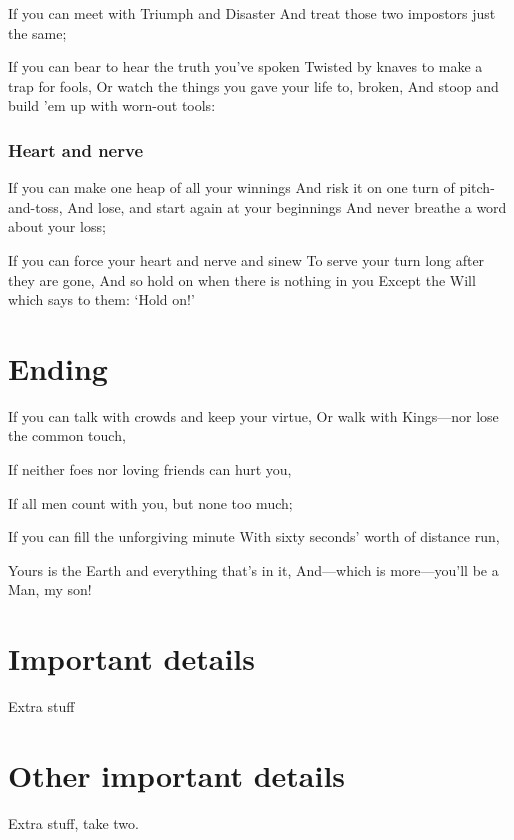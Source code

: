 \documentclass[a4paper, technote, compsoc]{IEEEtran}
\begin{document}
If you can meet with Triumph and Disaster
   And treat those two impostors just the same;   

If you can bear to hear the truth you’ve spoken
   Twisted by knaves to make a trap for fools,
Or watch the things you gave your life to, broken,
    And stoop and build ’em up with worn-out tools:

\subsubsection{Heart and nerve}

If you can make one heap of all your winnings
    And risk it on one turn of pitch-and-toss,
And lose, and start again at your beginnings
    And never breathe a word about your loss;

If you can force your heart and nerve and sinew
    To serve your turn long after they are gone,   
And so hold on when there is nothing in you
    Except the Will which says to them: ‘Hold on!’

\section{Ending}
If you can talk with crowds and keep your virtue,   
    Or walk with Kings—nor lose the common touch,

If neither foes nor loving friends can hurt you,

If all men count with you, but none too much;

If you can fill the unforgiving minute
    With sixty seconds’ worth of distance run,   

Yours is the Earth and everything that’s in it,   
    And—which is more—you’ll be a Man, my son!
    \cite{kipling}

\printbibliography

\newpage
\appendices
\label{sec:appendix}
\section{Important details}
Extra stuff

\section{Other important details}

Extra stuff, take two. 
\end{document}
